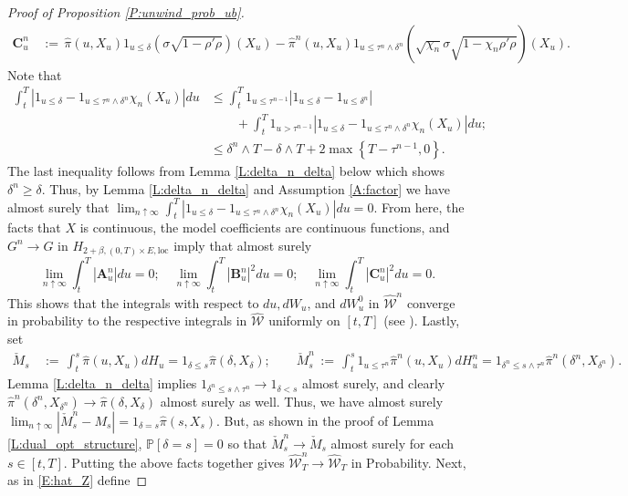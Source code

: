 \documentclass[11pt, letterpaper]{amsart}
\theoremstyle{definition}
\theoremstyle{remark}
\numberwithin{equation}{section}
\newcommand{\We}{\mathcal{W}}
\newcommand{\hwe}{\hat{\We}}
\newcommand{\hpi}{\hat{\pi}}
\newcommand{\prob}{\mathbb{P}}
\newcommand{\dfn}{\, := \,}
\newcommand{\bra}[1]{\left[#1\right]}
\newcommand{\cbra}[1]{\left\{#1\right\}}
\begin{document}
\begin{proof}[Proof of Proposition \ref{P:unwind_prob_ub}]
\begin{equation*}
\begin{split}
\mathbf{C}^n_u &\dfn \hpi(u,X_u)1_{u\leq \delta}(\sigma\sqrt{1-\rho'\rho})(X_u) - \hpi^n(u,X_u)1_{u\leq \tau^n\wedge\delta^n}(\sqrt{\chi_n}\sigma\sqrt{1-\chi_n\rho'\rho})(X_u).
\end{split}
\end{equation*}
Note that
\begin{equation*}
\begin{split}
\int_t^T \left|1_{u\leq \delta} - 1_{u\leq\tau^n\wedge\delta^n}\chi_n(X_u)\right|du &\leq \int_t^T 1_{u\leq\tau^{n-1}}\left|1_{u\leq\delta} - 1_{u\leq \delta^n}\right|\\
&\qquad  + \int_t^T 1_{u>\tau^{n-1}}\left|1_{u\leq\delta} - 1_{u\leq\tau^n\wedge\delta^n}\chi_n(X_u)\right|du;\\
&\leq \delta^n\wedge T - \delta\wedge T + 2\max\cbra{T-\tau^{n-1},0}.
\end{split}
\end{equation*}
The last inequality follows from Lemma \ref{L:delta_n_delta} below which shows $\delta^n\geq\delta$.  Thus, by Lemma \ref{L:delta_n_delta} and Assumption \ref{A:factor} we have almost surely that $\lim_{n\uparrow\infty} \int_t^T \left|1_{u\leq \delta} - 1_{u\leq\tau^n\wedge\delta^n}\chi_n(X_u)\right|du = 0$. From here, the facts that $X$ is continuous, the model coefficients are  continuous functions, and $G^n\rightarrow G$ in $H_{2+\beta,(0,T)\times E,\textrm{loc}}$ imply that almost surely
\begin{equation*}
\lim_{n\uparrow\infty} \int_t^T |\mathbf{A}^n_u|du = 0;\quad \lim_{n\uparrow\infty}\int_t^T |\mathbf{B}^n_u|^2du = 0;\quad \lim_{n\uparrow\infty} \int_t^T |\mathbf{C}^n_u|^2du = 0.
\end{equation*}
This shows that the integrals with respect to $du,dW_u$, and $dW^0_u$ in $\hwe^n$ converge in probability to the respective integrals in $\hwe$ uniformly on $[t,T]$ (see \cite[Proposition 3.2.26]{MR1121940}).  Lastly, set
\begin{equation*}
\begin{split}
\check{M}_s &\dfn \int_t^s \hpi(u,X_u)dH_u = 1_{\delta\leq s}\hpi(\delta,X_{\delta});\qquad \check{M}^n_s \dfn \int_t^s 1_{u\leq\tau^n} \hpi^n(u,X_u)dH^n_u = 1_{\delta^n\leq s\wedge\tau^n}\hpi^n(\delta^n,X_{\delta^n}).
\end{split}
\end{equation*}
Lemma \ref{L:delta_n_delta} implies $1_{\delta^n\leq s\wedge\tau^n} \rightarrow 1_{\delta < s}$ almost surely, and clearly $\hpi^n(\delta^n,X_{\delta^n})\rightarrow \hpi(\delta,X_{\delta})$ almost surely as well.  Thus, we have almost surely $\lim_{n\uparrow\infty} |\check{M}^n_s - M_s| = 1_{\delta = s} \hpi(s,X_s)$. But, as shown in the proof of Lemma \ref{L:dual_opt_structure}, $\prob\bra{\delta=s} = 0$ so that $\check{M}^n_s \rightarrow \check{M}_s$ almost surely for each $s\in [t,T]$.  Putting the above facts together gives $\hwe^n_T \rightarrow \hwe_T$ in Probability. Next, as in \eqref{E:hat_Z} define

\end{proof}
\end{document}
